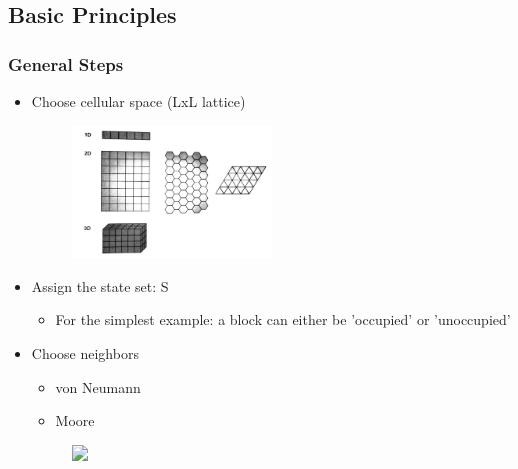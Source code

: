 \documentclass{beamer}
\begin{document}
\subsection{Basic Principles}
\frame
{
  \frametitle{General Steps}
  \begin{itemize}
  	\item Choose cellular space (LxL lattice)
  	\begin{figure}
	\includegraphics[width = 200, align=right]{lattice}
	\end{figure}
  \end{itemize}
}



\frame
{
\begin{itemize}
  \item<1-> Assign the state set:  S
      	\begin{itemize}
	\item For the simplest example: a block can either be 'occupied' or 'unoccupied'
	\end{itemize}
  \item<2-> Choose neighbors
    	\begin{itemize}
		\item von Neumann
		\item Moore
	\end{itemize}
	
	\begin{figure}
	\includegraphics<2->[width = 200, align=right]{neighborhood}
	\end{figure}
    \end{itemize}
}
\end{document}
